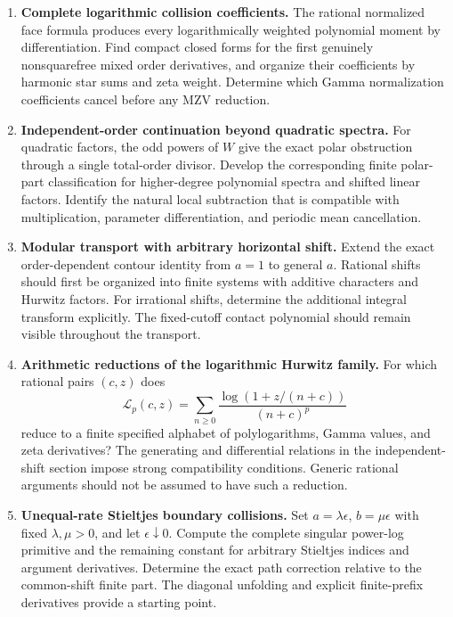 \documentclass[11pt,letterpaper]{article}
\numberwithin{equation}{section}
\theoremstyle{definition}
\theoremstyle{remark}
\begin{document}
\begin{enumerate}[label=\textbf{Q\arabic*.},leftmargin=*]
\item \textbf{Complete logarithmic collision coefficients.}
The rational normalized face formula produces every
logarithmically weighted polynomial moment by differentiation.
Find compact closed forms for the first genuinely nonsquarefree
mixed order derivatives, and organize their coefficients by
harmonic star sums and zeta weight. Determine which Gamma
normalization coefficients cancel before any MZV reduction.

\item \textbf{Independent-order continuation beyond quadratic spectra.}
For quadratic factors, the odd powers of \(W\) give the exact
polar obstruction through a single total-order divisor.
Develop the corresponding finite polar-part classification
for higher-degree polynomial spectra and shifted linear
factors. Identify the natural local subtraction that is
compatible with multiplication, parameter differentiation,
and periodic mean cancellation.

\item \textbf{Modular transport with arbitrary horizontal shift.}
Extend the exact order-dependent contour identity from
\(a=1\) to general \(a\). Rational shifts should first be
organized into finite systems with additive characters and
Hurwitz factors. For irrational shifts, determine the
additional integral transform explicitly. The fixed-cutoff
contact polynomial should remain visible throughout the
transport.

\item \textbf{Arithmetic reductions of the logarithmic Hurwitz family.}
For which rational pairs \((c,z)\) does
\[
 \mathcal L_p(c,z)=
 \sum_{n\ge0}\frac{\log(1+z/(n+c))}{(n+c)^p}
\]
reduce to a finite specified alphabet of polylogarithms,
Gamma values, and zeta derivatives?
The generating and differential relations in the
independent-shift section impose strong compatibility
conditions. Generic rational arguments should not be
assumed to have such a reduction.

\item \textbf{Unequal-rate Stieltjes boundary collisions.}
Set \(a=\lambda\epsilon\), \(b=\mu\epsilon\) with fixed
\(\lambda,\mu>0\), and let \(\epsilon\downarrow0\).
Compute the complete singular power-log primitive and
the remaining constant for arbitrary Stieltjes indices
and argument derivatives. Determine the exact path
correction relative to the common-shift finite part.
The diagonal unfolding and explicit finite-prefix
derivatives provide a starting point.


\end{enumerate}
\end{document}
